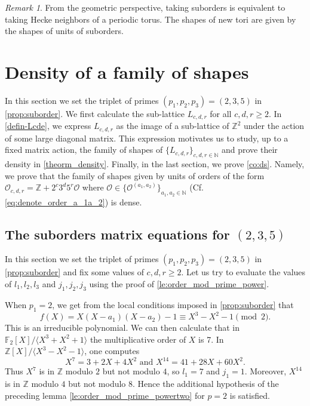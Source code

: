 \documentclass[11pt,letterpaper]{amsart}
\theoremstyle{definition}
\theoremstyle{remark}
\newtheorem{rem}[theorem]{Remark}
\newcommand{\cal}[1]{\mathcal{#1}}
\newcommand{\bb}[1]{\mathbb{#1}}
\newcommand{\Z}{\bb Z}
\newcommand{\N}{\bb N}
\newcommand{\calO}{\cal O}
\begin{document}
	\begin{rem}
	From the geometric perspective, taking suborders is equivalent to taking Hecke neighbors of a periodic torus. The shapes of new tori are given by the shapes of units of suborders.
	\end{rem}
	
	
	\section{Density of a family of shapes}
	\label{ss:density}
In this section we set the triplet of primes $(p_1,p_2,p_3)=(2,3,5)$ in \cref{prop:suborder}.
We first calculate the sub-lattice $L_{c,d,r}$ for all $c,d,r \geq 2$.
In \cref{defin-Lcde}, we express $L_{c,d,r}$ as the image of a sub-lattice of $\Z^2$ under the action of some large diagonal matrix.
This expression motivates us to study, up to a fixed matrix action, the family of shapes of $\lbrace L_{c,d,r} \rbrace_{c,d,r \in \N}$ and prove their density in \cref{theorm_density}.
Finally, in the last section, we prove \cref{co:ds}. 
Namely, we prove that the family of shapes given by units of orders of the form $\calO_{c,d,r}=\Z + 2^c 3^d 5^r \calO$ where $\calO \in \lbrace \calO^{(a_1,a_2)}\rbrace_{a_1,a_2 \in \N}$ (Cf. \eqref{eq:denote_order_a_1a_2}) is dense.

	\subsection{The suborders matrix equations for \texorpdfstring{$(2,3,5)$}{(2,3,5)}}
	In this section we set the triplet of primes $(p_1,p_2,p_3)=(2,3,5)$ in \cref{prop:suborder} and fix some values of $c,d,r \geq 2$.
	Let us try to evaluate the values of $l_1,l_2,l_3$ and $j_1,j_2,j_3$ using the proof of \cref{le:order_mod_prime_power}.
	
	When $p_1=2$, we get from the local conditions imposed in \cref{prop:suborder} that
	$$f(X) = X(X-a_1)(X-a_2) - 1 \equiv X^3-X^{2}-1 \pmod{2}.$$ This is an irreducible polynomial. We can then calculate that in $\mathbb{F}_2[X]/\langle X^{3}+X^{2}+ 1 \rangle$ the multiplicative order of $X$ is 7. 
  In $\Z[X]/\langle X^3-X^2-1\rangle$, one computes
  \[
  X^7=3+2X+4X^2 \text{ and }
  X^{14}=41+28X+60X^2.
  \]
  Thus $X^7$ is in $\mathbb{Z}$ modulo $2$ but not modulo $4$, so
  $l_1=7$ and $j_1=1$. Moreover, $X^{14}$ is in  $\mathbb{Z}$ modulo $4$
  but not modulo $8$. Hence the additional hypothesis of the preceding
  lemma \cref{le:order_mod_prime_powertwo} for $p=2$ is satisfied.
\end{document}
